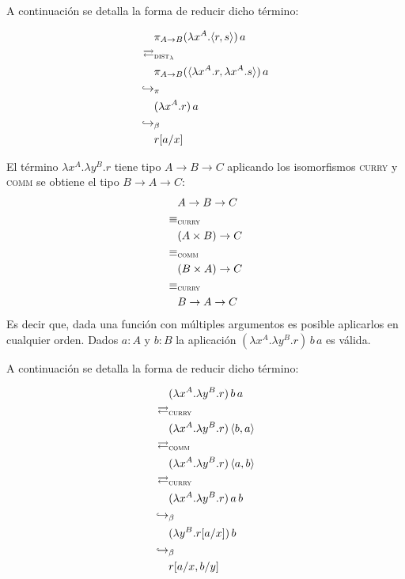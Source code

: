 A continuación se detalla la forma de reducir dicho término:

\begin{align*}
	&\pi_{A \rightarrow B}(\lambda x^A . \langle r,s \rangle)\, a \\
	\rightleftarrows&_{\textsc{dist}_\lambda} \\
	&\pi_{A \rightarrow B}(\langle \lambda x^A.r, \lambda x^A.s \rangle)\, a \\
	\hookrightarrow&_\pi \\
	&(\lambda x^A. r)\, a \\
	\hookrightarrow&_\beta \\
	&r[a/x]
\end{align*}

El término $\lambda x^A. \lambda y^B. r$ tiene tipo $A \rightarrow B \rightarrow C$ aplicando los isomorfismos \textsc{curry} y \textsc{comm} se obtiene el tipo $B \rightarrow A \rightarrow C$:
\begin{align*}
	&A \rightarrow B \rightarrow C \\
	\equiv&_\textsc{curry} \\
	&(A \times B) \rightarrow C \\
	\equiv&_\textsc{comm} \\
	&(B \times A) \rightarrow C \\
	\equiv&_\textsc{curry} \\
	&B \rightarrow A \rightarrow C
\end{align*}
Es decir que, dada una función con múltiples argumentos es posible aplicarlos en cualquier orden.
Dados $a: A$ y $b : B$ la aplicación $(\lambda x^A. \lambda y^B. r)\, b\, a$ es válida.

A continuación se detalla la forma de reducir dicho término:

\begin{align*}
	&(\lambda x^A. \lambda y^B. r)\, b\, a \\
	\rightleftarrows&_\textsc{curry} \\
	&(\lambda x^A. \lambda y^B. r)\, \langle b,a \rangle \\
	\rightleftarrows&_\textsc{comm} \\
	&(\lambda x^A. \lambda y^B. r)\, \langle a,b \rangle \\
	\rightleftarrows&_\textsc{curry} \\
	&(\lambda x^A. \lambda y^B. r)\, a\, b \\
	\hookrightarrow&_\beta \\
	&(\lambda y^B. r[a/x])\, b \\
	\hookrightarrow&_\beta \\
	&r[a/x, b/y]
\end{align*}

